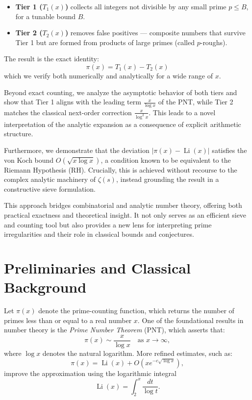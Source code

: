 \documentclass[11pt]{article}
\begin{document}
	\begin{itemize}
		\item \textbf{Tier 1 ($T_1(x)$)} collects all integers not divisible by any small prime $p \leq B$, for a tunable bound $B$.
		\item \textbf{Tier 2 ($T_2(x)$)} removes false positives — composite numbers that survive Tier 1 but are formed from products of large primes (called $p$-roughs).
	\end{itemize}
	
	The result is the exact identity:
	\[
	\pi(x) = T_1(x) - T_2(x)
	\]
	which we verify both numerically and analytically for a wide range of $x$.
	
	Beyond exact counting, we analyze the asymptotic behavior of both tiers and show that Tier 1 aligns with the leading term $\frac{x}{\log x}$ of the PNT, while Tier 2 matches the classical next-order correction $\frac{x}{\log^2 x}$. This leads to a novel interpretation of the analytic expansion as a consequence of explicit arithmetic structure.
	
	Furthermore, we demonstrate that the deviation $|\pi(x) - \operatorname{Li}(x)|$ satisfies the von Koch bound $O(\sqrt{x \log x})$, a condition known to be equivalent to the Riemann Hypothesis (RH). Crucially, this is achieved without recourse to the complex analytic machinery of $\zeta(s)$, instead grounding the result in a constructive sieve formulation.
	
	This approach bridges combinatorial and analytic number theory, offering both practical exactness and theoretical insight. It not only serves as an efficient sieve and counting tool but also provides a new lens for interpreting prime irregularities and their role in classical bounds and conjectures.
	
	
	\section{Preliminaries and Classical Background}
	
	Let $\pi(x)$ denote the prime-counting function, which returns the number of primes less than or equal to a real number $x$. One of the foundational results in number theory is the \textit{Prime Number Theorem} (PNT), which asserts that:
	\[
	\pi(x) \sim \frac{x}{\log x} \quad \text{as } x \to \infty,
	\]
	where $\log x$ denotes the natural logarithm. More refined estimates, such as:
	\[
	\pi(x) = \operatorname{Li}(x) + O\left(x e^{-c\sqrt{\log x}}\right),
	\]
	improve the approximation using the logarithmic integral
	\[
	\operatorname{Li}(x) = \int_2^x \frac{dt}{\log t}.
	\]
	
\end{document}
